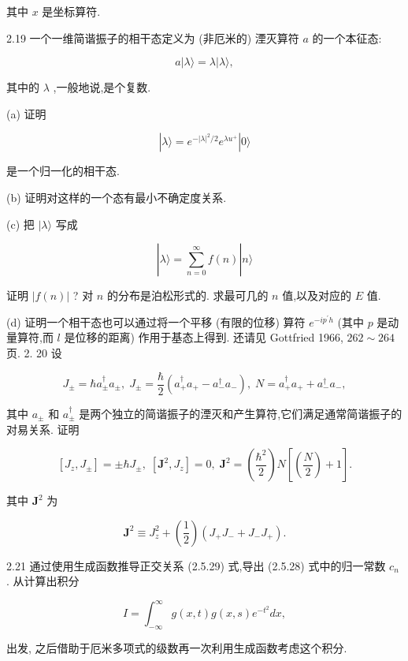 \documentclass[lang=cn,newtx,10pt,scheme=chinese,thmcnt=section]{elegantbook}
\begin{document}
其中 $x$ 是坐标算符.

2.19 一个一维简谐振子的相干态定义为 (非厄米的) 湮灭算符 $a$ 的一个本征态:

$$
a\left| {\lambda \rangle = \lambda }\right| \lambda \rangle ,
$$

其中的 $\lambda$ ,一般地说,是个复数.

(a) 证明

$$
\left| {\lambda \rangle = {e}^{-{\left| \lambda \right| }^{2}/2}{e}^{\lambda {u}^{ + }}}\right| 0\rangle
$$

是一个归一化的相干态.

(b) 证明对这样的一个态有最小不确定度关系.

(c) 把 $|\lambda \rangle$ 写成

$$
\left| {\lambda \rangle = \mathop{\sum }\limits_{{n = 0}}^{\infty }f\left( n\right) }\right| n\rangle
$$

证明 $\left| {f\left( n\right) }\right|$ ? 对 $n$ 的分布是泊松形式的. 求最可几的 $n$ 值,以及对应的 $E$ 值.

(d) 证明一个相干态也可以通过将一个平移 (有限的位移) 算符 ${e}^{-i{p}^{\prime }h}$ (其中 $p$ 是动量算符,而 $l$ 是位移的距离) 作用于基态上得到. 还请见 Gottfried 1966, ${262} \sim {264}$ 页. 2. 20 设

$$
{J}_{ \pm } = \hbar {a}_{ \pm }^{ \dagger }{a}_{ \pm },\;{J}_{ \pm } = \frac{\hbar }{2}\left( {{a}_{ + }^{ \dagger }{a}_{ + } - {a}_{ - }^{ \dagger }{a}_{ - }}\right) ,\;N = {a}_{ + }^{ \dagger }{a}_{ + } + {a}_{ - }^{ \dagger }{a}_{ - },
$$

其中 ${a}_{ \pm }$ 和 ${a}_{ \pm }^{ \dagger }$ 是两个独立的简谐振子的湮灭和产生算符,它们满足通常简谐振子的对易关系. 证明

$$
\left\lbrack {{J}_{z},{J}_{ \pm }}\right\rbrack = \pm \hbar {J}_{ \pm },\;\left\lbrack {{\mathbf{J}}^{2},{J}_{z}}\right\rbrack = 0,\;{\mathbf{J}}^{2} = \left( \frac{{\hbar }^{2}}{2}\right) N\left\lbrack {\left( \frac{N}{2}\right) + 1}\right\rbrack .
$$

其中 ${\mathbf{J}}^{2}$ 为

$$
{\mathbf{J}}^{2} \equiv {J}_{z}^{2} + \left( \frac{1}{2}\right) \left( {{J}_{ + }{J}_{ - } + {J}_{ - }{J}_{ + }}\right) .
$$

2.21 通过使用生成函数推导正交关系 (2.5.29) 式,导出 (2.5.28) 式中的归一常数 ${c}_{n}$ . 从计算出积分

$$
I = {\int }_{-\infty }^{\infty }g\left( {x, t}\right) g\left( {x, s}\right) {e}^{-{t}^{2}}{dx},
$$

出发, 之后借助于厄米多项式的级数再一次利用生成函数考虑这个积分.
\end{document}
